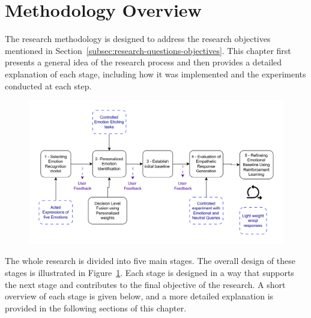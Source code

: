 \section{Methodology Overview}
\label{sec:methodology-overview}

The research methodology is designed to address the research objectives mentioned in Section~\ref{subsec:research-questions-objectives}. This chapter first presents a general idea of the research process and then provides a detailed explanation of each stage, including how it was implemented and the experiments conducted at each step.

\begin{figure}[h]
    \centering
    \includegraphics[width=1\textwidth]{img/chapter_03/methodology.jpg}
    \label{fig:design-stages}
\end{figure}

The whole research is divided into five main stages. The overall design of these stages is illustrated in Figure~\ref{fig:design-stages}. Each stage is designed in a way that supports the next stage and contributes to the final objective of the research. A short overview of each stage is given below, and a more detailed explanation is provided in the following sections of this chapter.


